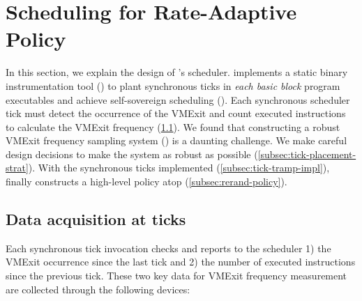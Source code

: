 \section{Scheduling for Rate-Adaptive Policy}
\label{sec:scheduling}


In this section, we explain the design of \thename's scheduler.
\thename implements a static binary instrumentation tool (\reqtransparent) to plant synchronous ticks in \emph{each basic block} program executables and achieve self-sovereign scheduling (\reqsovereign).
Each synchronous scheduler tick must detect the occurrence of the VMExit and count executed instructions to calculate the VMExit frequency (\cref{subsec:vmexit-rate-data-acquisition}).
We found that constructing a robust VMExit frequency sampling system (\reqrobustpolicy) is a daunting challenge.
We make careful design decisions to make the system as robust as possible (\cref{subsec:tick-placement-strat}).
With the synchronous ticks implemented (\cref{subsec:tick-tramp-impl}), \thename finally constructs a high-level policy atop (\cref{subsec:rerand-policy}).


\subsection{Data acquisition at ticks}
\label{subsec:vmexit-rate-data-acquisition}
Each synchronous tick invocation checks and reports to the scheduler 1) the VMExit occurrence since the last tick and 2) the number of executed instructions since the previous tick.
These two key data for VMExit frequency measurement are collected through the following devices:


